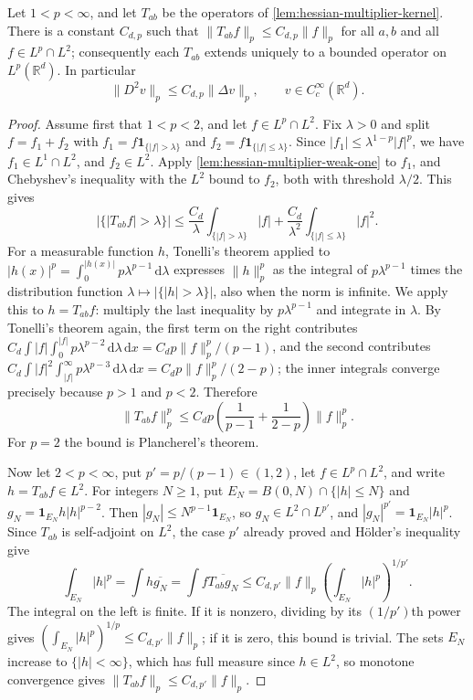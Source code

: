 \begin{theorem}\label{thm:hessian-multiplier-lp}
Let $1<p<\infty$, and let $T_{ab}$ be the operators of \cref{lem:hessian-multiplier-kernel}. There is a constant $C_{d,p}$ such that $\|T_{ab}f\|_p\leq C_{d,p}\|f\|_p$ for all $a,b$ and all $f\in L^p\cap L^2$; consequently each $T_{ab}$ extends uniquely to a bounded operator on $L^p(\mathbb R^d)$. In particular
\begin{equation}\label{eq:euclidean-hessian-lp}
 \|D^2v\|_p\leq C_{d,p}\|\Delta v\|_p,
 \qquad v\in C_c^\infty(\mathbb R^d).
\end{equation}
\end{theorem}
\begin{proof}
Assume first that $1<p<2$, and let $f\in L^p\cap L^2$. Fix $\lambda>0$ and split $f=f_1+f_2$ with $f_1=f\mathbf1_{\{|f|>\lambda\}}$ and $f_2=f\mathbf1_{\{|f|\leq\lambda\}}$. Since $|f_1|\leq\lambda^{1-p}|f|^p$, we have $f_1\in L^1\cap L^2$, and $f_2\in L^2$. Apply \cref{lem:hessian-multiplier-weak-one} to $f_1$, and Chebyshev's inequality with the $L^2$ bound to $f_2$, both with threshold $\lambda/2$. This gives
\[
 |\{|T_{ab}f|>\lambda\}|
 \leq\frac{C_d}{\lambda}\int_{\{|f|>\lambda\}}|f|
      +\frac{C_d}{\lambda^2}\int_{\{|f|\leq\lambda\}}|f|^2.
\]
For a measurable function $h$, Tonelli's theorem applied to $|h(x)|^p=\int_0^{|h(x)|}p\lambda^{p-1}\,\mathrm d\lambda$ expresses $\|h\|_p^p$ as the integral of $p\lambda^{p-1}$ times the distribution function $\lambda\mapsto|\{|h|>\lambda\}|$, also when the norm is infinite. We apply this to $h=T_{ab}f$: multiply the last inequality by $p\lambda^{p-1}$ and integrate in $\lambda$. By Tonelli's theorem again, the first term on the right contributes $C_d\int|f|\int_0^{|f|}p\lambda^{p-2}\,\mathrm d\lambda\,\mathrm d x=C_dp\|f\|_p^p/(p-1)$, and the second contributes $C_d\int|f|^2\int_{|f|}^\infty p\lambda^{p-3}\,\mathrm d\lambda\,\mathrm d x=C_dp\|f\|_p^p/(2-p)$; the inner integrals converge precisely because $p>1$ and $p<2$. Therefore
\[
 \|T_{ab}f\|_p^p
 \leq C_dp\left(\frac1{p-1}+\frac1{2-p}\right)\|f\|_p^p.
\]
For $p=2$ the bound is Plancherel's theorem.

Now let $2<p<\infty$, put $p'=p/(p-1)\in(1,2)$, let $f\in L^p\cap L^2$, and write $h=T_{ab}f\in L^2$. For integers $N\geq1$, put $E_N=B(0,N)\cap\{|h|\leq N\}$ and $g_N=\mathbf1_{E_N}h|h|^{p-2}$. Then $|g_N|\leq N^{p-1}\mathbf1_{E_N}$, so $g_N\in L^2\cap L^{p'}$, and $|g_N|^{p'}=\mathbf1_{E_N}|h|^p$. Since $T_{ab}$ is self-adjoint on $L^2$, the case $p'$ already proved and H\"older's inequality give
\[
 \int_{E_N}|h|^p=\int h\overline{g_N}
 =\int f\overline{T_{ab}g_N}
 \leq C_{d,p'}\|f\|_p\left(\int_{E_N}|h|^p\right)^{1/p'}.
\]
The integral on the left is finite. If it is nonzero, dividing by its $(1/p')$th power gives $(\int_{E_N}|h|^p)^{1/p}\leq C_{d,p'}\|f\|_p$; if it is zero, this bound is trivial. The sets $E_N$ increase to $\{|h|<\infty\}$, which has full measure since $h\in L^2$, so monotone convergence gives $\|T_{ab}f\|_p\leq C_{d,p'}\|f\|_p$.


\end{proof}
